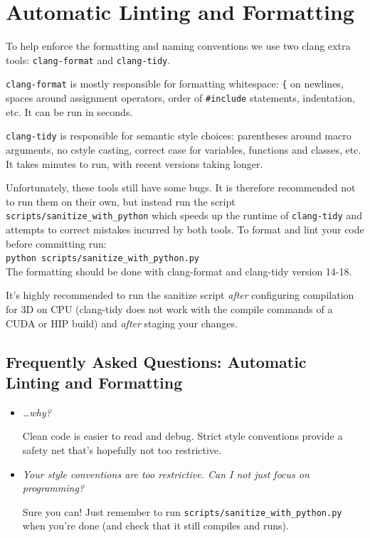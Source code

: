 \documentclass[11pt]{article}
\begin{document}
\section{Automatic Linting and Formatting}
To help enforce the formatting and naming conventions we use two clang extra tools: \verb|clang-format| and \verb|clang-tidy|.

\verb|clang-format| is mostly responsible for formatting whitespace: \verb|{| on newlines, spaces around assignment operators, order of \lstinline{#include} statements, indentation, etc. It can be run in seconds.

\verb|clang-tidy| is responsible for semantic style choices: parentheses around macro arguments, no cstyle casting, correct case for variables, functions and classes, etc. It takes minutes to run, with recent versions taking longer.

\begin{warning}
    Unfortunately, these tools still have some bugs. It is therefore recommended not to run them on their own, but instead run the script \verb|scripts/sanitize_with_python| which speeds up the runtime of \verb|clang-tidy| and attempts to correct mistakes incurred by both tools.
    To format and lint your code before committing run:\\
    \verb|python scripts/sanitize_with_python.py|\\
    The formatting should be done with clang-format and clang-tidy version 14-18.
\end{warning}
\begin{tip}
    It's highly recommended to run the sanitize script \emph{after} configuring compilation for 3D on CPU (clang-tidy does not work with the compile commands of a CUDA or HIP build) and \emph{after} staging your changes.
\end{tip}

\subsection*{Frequently Asked Questions: Automatic Linting and Formatting}
\begin{itemize}
    \item \emph{\ldots why?}

    Clean code is easier to read and debug. Strict style conventions provide a safety net that's hopefully not too restrictive.

    \item \emph{Your style conventions are too restrictive. Can I not just focus on programming?}
    
    Sure you can! Just remember to run \verb|scripts/sanitize_with_python.py| when you're done (and check that it still compiles and runs).

\end{itemize}
\end{document}
